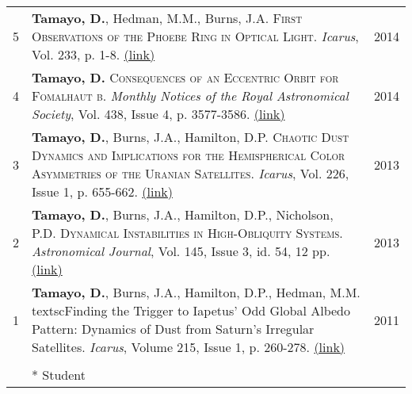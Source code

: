\documentclass[10pt]{article} %
\begin{document}
\begin{tabular}{>{\hfill}r|p{14.3cm}l}
5 & {\bf Tamayo, D.}, Hedman, M.M., Burns, J.A. \textsc{First Observations of the Phoebe Ring in Optical Light}. {\it Icarus}, Vol. 233, p. 1-8. \href{http://arxiv.org/abs/1401.6166}{(link)}& 2014  \\

4 & {\bf Tamayo, D.} \textsc{Consequences of an Eccentric Orbit for Fomalhaut b}. {\it Monthly Notices of the Royal Astronomical Society}, Vol. 438, Issue 4, p. 3577-3586. \href{http://arxiv.org/abs/1312.7020}{(link)} & 2014 \\

3 & {\bf Tamayo, D.}, Burns, J.A., Hamilton, D.P. \textsc{Chaotic Dust Dynamics and Implications for the Hemispherical Color Asymmetries of the Uranian Satellites}. {\it Icarus}, Vol. 226, Issue 1, p. 655-662. \href{http://arxiv.org/abs/1306.3973}{(link)} & 2013 \\ 

2 & {\bf Tamayo, D.}, Burns, J.A., Hamilton, D.P., Nicholson, P.D. \textsc{Dynamical Instabilities in High-Obliquity Systems}. {\it Astronomical Journal}, Vol. 145, Issue 3, id. 54, 12 pp. \href{http://arxiv.org/abs/1212.0028}{(link)} & 2013 \\

1 & {\bf Tamayo, D.}, Burns, J.A., Hamilton, D.P., Hedman, M.M. textsc{Finding the Trigger to Iapetus' Odd Global Albedo Pattern: Dynamics of Dust from Saturn's Irregular Satellites}. {\it Icarus}, Volume 215, Issue 1, p. 260-278. \href{http://arxiv.org/abs/1106.1893}{(link)} & 2011 \\

\multicolumn{3}{c}{} \\

& * Student
\end{tabular}


\end{document}
